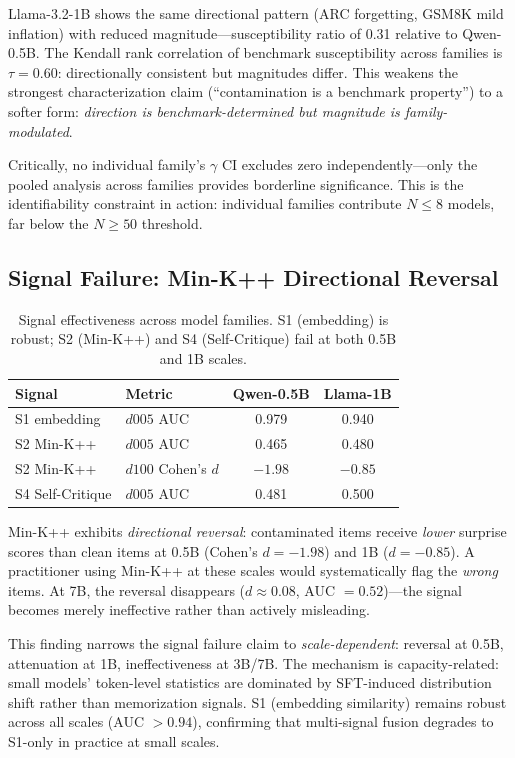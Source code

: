 \documentclass[11pt,a4paper]{article}
\begin{document}
Llama-3.2-1B shows the same directional pattern (ARC forgetting, GSM8K mild inflation) with reduced magnitude---susceptibility ratio of 0.31 relative to Qwen-0.5B. The Kendall rank correlation of benchmark susceptibility across families is $\tau = 0.60$: directionally consistent but magnitudes differ. This weakens the strongest characterization claim (``contamination is a benchmark property'') to a softer form: \emph{direction is benchmark-determined but magnitude is family-modulated}.

Critically, no individual family's $\gamma$ CI excludes zero independently---only the pooled analysis across families provides borderline significance. This is the identifiability constraint in action: individual families contribute $N \leq 8$ models, far below the $N \geq 50$ threshold.

\subsection{Signal Failure: Min-K++ Directional Reversal}

\begin{table}[t]
\centering
\small
\caption{Signal effectiveness across model families. S1 (embedding) is robust; S2 (Min-K++) and S4 (Self-Critique) fail at both 0.5B and 1B scales.}
\label{tab:signals}
\begin{tabular}{llcc}
\toprule
Signal & Metric & Qwen-0.5B & Llama-1B \\
\midrule
S1 embedding & $d005$ AUC & 0.979 & 0.940 \\
S2 Min-K++ & $d005$ AUC & 0.465 & 0.480 \\
S2 Min-K++ & $d100$ Cohen's $d$ & $-1.98$ & $-0.85$ \\
S4 Self-Critique & $d005$ AUC & 0.481 & 0.500 \\
\bottomrule
\end{tabular}
\end{table}

Min-K++ exhibits \emph{directional reversal}: contaminated items receive \emph{lower} surprise scores than clean items at 0.5B (Cohen's $d = -1.98$) and 1B ($d = -0.85$). A practitioner using Min-K++ at these scales would systematically flag the \emph{wrong} items. At 7B, the reversal disappears ($d \approx 0.08$, AUC $= 0.52$)---the signal becomes merely ineffective rather than actively misleading.

This finding narrows the signal failure claim to \emph{scale-dependent}: reversal at 0.5B, attenuation at 1B, ineffectiveness at 3B/7B. The mechanism is capacity-related: small models' token-level statistics are dominated by SFT-induced distribution shift rather than memorization signals. S1 (embedding similarity) remains robust across all scales (AUC $> 0.94$), confirming that multi-signal fusion degrades to S1-only in practice at small scales.
\end{document}
